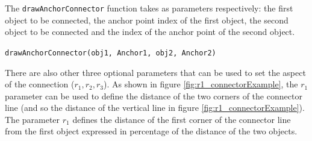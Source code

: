 \documentclass[a4paper,12pt]{report}
\begin{document}
The \texttt{drawAnchorConnector} function takes as parameters respectively: the first object to be connected, the anchor point index of the first object, the second object to be connected and the index of the anchor point of the second object.

\texttt{drawAnchorConnector(obj1, Anchor1, obj2, Anchor2)}

There are also other three optional parameters that can be used to set the aspect of the connection ($r_1,r_2,r_3$). As shown in figure \ref{fig:r1_connectorExample}, the $r_1$ parameter can be used to define the distance of the two corners of the connector line (and so the distance of the vertical line in figure \ref{fig:r1_connectorExample}). The parameter $r_1$ defines the distance of the first corner of the connector line from the first object expressed in percentage of the distance of the two objects.
\end{document}
